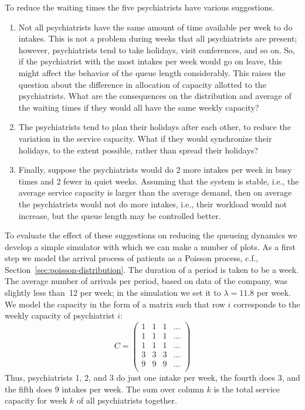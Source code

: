 To reduce the waiting times the five psychiatrists have various
suggestions. 
\begin{enumerate}
\item Not all psychiatrists have the same amount of time available per
  week to do intakes. This is not a problem during weeks that all psychiatrists are
  present; however, psychiatrists tend to take holidays, visit
  conferences, and so on. So, if the psychiatrist with the most
  intakes per week would go on leave, this might affect the behavior
  of the queue length considerably. This raises the question about the difference
  in allocation of capacity allotted to the psychiatrists. What are
  the consequences on the distribution and average of the waiting
  times if they would all have the same weekly capacity?
\item The psychiatrists tend to plan their holidays after each
  other, to reduce the variation in the service capacity. What if they
  would synchronize their holidays, to the extent possible, rather
  than spread their holidays? 
\item Finally, suppose the psychiatrists would do 2 more intakes per
  week in busy times and 2 fewer in quiet weeks. Assuming that the
  system is stable, i.e., the average service capacity is larger than the average demand,
  then on average the psychiatrists would not do more intakes, i.e.,
  their workload would not increase, but the queue length may be
  controlled better.
\end{enumerate}


To evaluate the effect of these suggestions on reducing the queueing
dynamics we develop a simple simulator with which we can make a number of plots. 
As a first step we model the arrival process of patients as a Poisson
process, c.f., Section~\ref{sec:poisson-distribution}. The duration of
a period is taken to be a week. The average number of arrivals per
period, based on data of the company, was slightly less than~12 per
week; in the simulation we set it to $\lambda= 11.8$ per week. We
model the capacity in the form of a matrix such that row $i$
corresponds to the weekly capacity of psychiatrist $i$:
\begin{equation*}
C = 
  \begin{pmatrix}
    1 & 1 & 1 & \ldots\\
    1 & 1 & 1 & \ldots\\
    1 & 1 & 1 & \ldots\\
    3 & 3 & 3 & \ldots\\
    9 & 9 & 9 & \ldots\\
  \end{pmatrix}
\end{equation*}
Thus, psychiatrists 1, 2, and 3 do just one intake per week, the
fourth does 3, and the fifth does 9 intakes per week. The sum over
column $k$ is the total service capacity for week $k$ of all
psychiatrists together.

